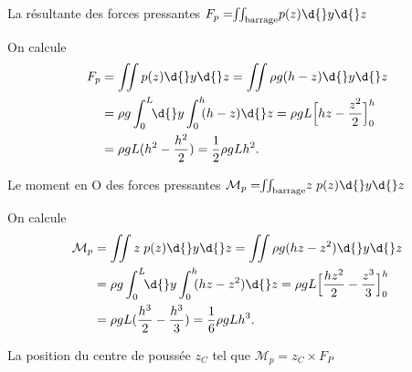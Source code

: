 \begin{enonce}
La résultante des forces pressantes $F_p=\!\!\iint_\mathrm{barrage}\! p(z) \d{}y \d{}z$
\end{enonce}


\begin{corrige}
On calcule \minusBigskip\minusSmallskip
\begin{align*}
F_p
&=\iint p(z) \d{}y \d{}z = \iint \rho g (h-z) \d{}y \d{}z \\
&= \rho g \int_0^L \!\! \d{}y \int_0^h \!\! (h-z) \d{}z =  \rho g L \Big[ hz-\frac{z^2}{2} \Big]_0^h \\
& = \rho g L (h^2-\frac{h^2}{2}) = \frac{1}{2} \rho g L h^2.
\end{align*}
\end{corrige}




\begin{enonce}
Le moment en O des forces pressantes $\mathcal{M}_p=\!\!\iint_\mathrm{barrage}\! z \; p(z) \d{}y \d{}z$
\end{enonce}


\begin{corrige}
On calcule \minusBigskip\minusSmallskip
\begin{align*}
\mathcal{M}_p
&=\iint z \; p(z) \d{}y \d{}z = \iint \rho g (hz-z^2) \d{}y \d{}z \\
&=\rho g \int_0^L \!\! \d{}y \int_0^h \!\! (hz-z^2) \d{}z =  \rho g L \Big[ \frac{hz^2}{2}-\frac{z^3}{3} \Big]_0^h \\
&= \rho g L (\frac{h^3}{2}-\frac{h^3}{3}) = \frac{1}{6} \rho g L h^3.
\end{align*}
 \end{corrige}




\begin{enonce}
La position du centre de poussée $z_C$ tel que $\mathcal{M}_p=z_C\times F_P$
\end{enonce}

